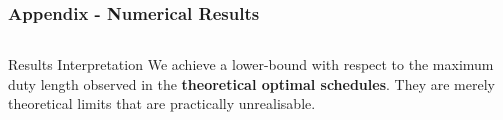 \documentclass[handout]{beamer}
\begin{document}
\begin{frame}
	\frametitle{Appendix - Numerical Results}

\vspace{\baselineskip}
\vspace{\baselineskip}

	\begin{columns}[]
			\centering
	\end{columns}

\vspace{\baselineskip}
\vspace{\baselineskip}
\vspace{\baselineskip}
        
        \begin{block}{Results Interpretation}
		We achieve a lower-bound with respect to the maximum duty length observed in the \textbf{theoretical optimal schedules}. They are merely theoretical limits that are practically unrealisable.
	\end{block}

    
\end{frame}

\end{document}
